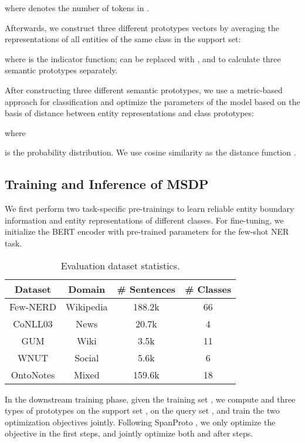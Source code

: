 \documentclass[sigconf,natbib=true,anonymous=False]{acmart}
\begin{document}
where  denotes the number of tokens in .


Afterwards, we construct three different prototypes vectors by averaging the representations of all entities of the same class in the support set:

where  is the indicator function;  can be replaced with , and to calculate three semantic prototypes separately.

After constructing three different semantic prototypes, we use a metric-based approach for classification and optimize the parameters of the model based on the basis of distance between entity representations and class prototypes:

where 

is the probability distribution. We use cosine similarity as the distance function .




\subsection{Training and Inference of MSDP}
We first perform two task-specific pre-trainings to learn reliable entity boundary information and entity representations of different classes. For fine-tuning, we initialize the BERT encoder with pre-trained parameters for the few-shot NER task.


\begin{table}[htbp]
  \renewcommand\tabcolsep{3pt}
  \centering
    \begin{tabular}{cccc}
    \hline
    \textbf{Dataset} & \textbf{Domain} & \textbf{\# Sentences} & \textbf{\# Classes} \bigstrut\\
    \hline
    Few-NERD & Wikipedia & 188.2k & 66 \bigstrut[t]\\
    CoNLL03 & News  & 20.7k & 4 \\
    GUM   & Wiki  & 3.5k  & 11 \\
    WNUT  & Social & 5.6k  & 6 \\
    OntoNotes & Mixed & 159.6k & 18 \bigstrut[b]\\
    \hline
    \end{tabular}\caption{Evaluation dataset statistics.}
  \label{tab:datasets}\vspace{-0.2cm}
\end{table}In the downstream training phase, given the training set , we compute  and three types of prototypes on the support set ,  on the query set , and train the two optimization objectives jointly. Following SpanProto \cite{wang2022spanproto}, we only optimize the  objective in the first  steps, and jointly optimize both  and  after  steps. 
\end{document}
